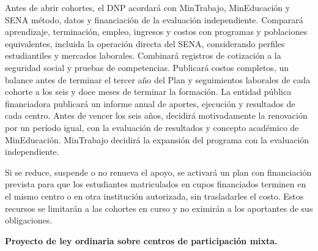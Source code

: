 Antes de abrir cohortes, el DNP acordará con MinTrabajo, MinEducación y SENA método, datos y financiación de la evaluación independiente. Comparará aprendizaje, terminación, empleo, ingresos y costos con programas y poblaciones equivalentes, incluida la operación directa del SENA, considerando perfiles estudiantiles y mercados laborales. Combinará registros de cotización a la seguridad social y pruebas de competencias. Publicará costos completos, un balance antes de terminar el tercer año del Plan y seguimientos laborales de cada cohorte a los seis y doce meses de terminar la formación. La entidad pública financiadora publicará un informe anual de aportes, ejecución y resultados de cada centro. Antes de vencer los seis años, decidirá motivadamente la renovación por un período igual, con la evaluación de resultados y concepto académico de MinEducación. MinTrabajo decidirá la expansión del programa con la evaluación independiente.

Si se reduce, suspende o no renueva el apoyo, se activará un plan con financiación prevista para que los estudiantes matriculados en cupos financiados terminen en el mismo centro o en otra institución autorizada, sin trasladarles el costo. Estos recursos se limitarán a las cohortes en curso y no eximirán a los aportantes de sus obligaciones.

\begingroup
\textbf{Proyecto de ley ordinaria sobre centros de participación mixta.}\par\nobreak

